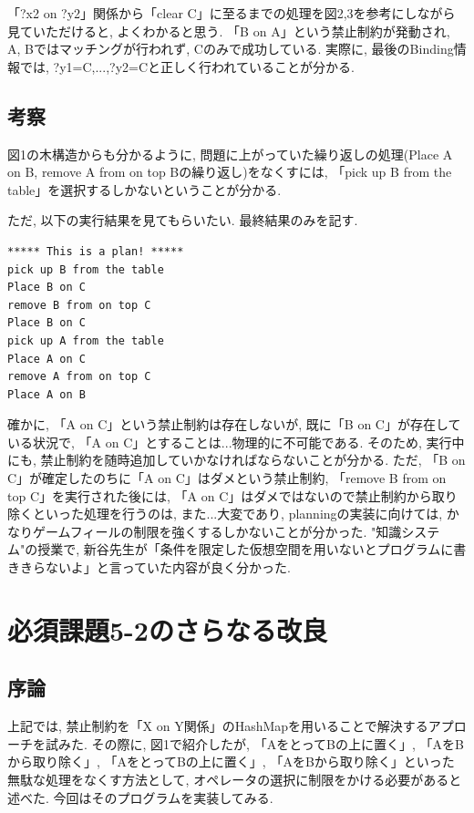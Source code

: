 \documentclass[uplatex,12pt]{jsarticle}
\begin{document}
「?x2 on ?y2」関係から「clear C」に至るまでの処理を図2,3を参考にしながら見ていただけると, よくわかると思う. 「B on A」という禁止制約が発動され, A, Bではマッチングが行われず, Cのみで成功している. 実際に, 最後のBinding情報では, {?y1=C,...,?y2=C}と正しく行われていることが分かる.

\subsection{考察}
図1の木構造からも分かるように, 問題に上がっていた繰り返しの処理(Place A on B, remove A from on top Bの繰り返し)をなくすには, 「pick up B from the table」を選択するしかないということが分かる.

ただ, 以下の実行結果を見てもらいたい. 最終結果のみを記す.
\begin{lstlisting}[caption=A on Cが生じてしまう, label=src:No1]
***** This is a plan! *****
pick up B from the table
Place B on C
remove B from on top C
Place B on C
pick up A from the table
Place A on C
remove A from on top C
Place A on B
\end{lstlisting}


確かに, 「A on C」という禁止制約は存在しないが, 既に「B on C」が存在している状況で, 「A on C」とすることは...物理的に不可能である. そのため, 実行中にも, 禁止制約を随時追加していかなければならないことが分かる. ただ, 「B on C」が確定したのちに「A on C」はダメという禁止制約, 「remove B from on top C」を実行された後には, 「A on C」はダメではないので禁止制約から取り除くといった処理を行うのは, また...大変であり, planningの実装に向けては, かなりゲームフィールの制限を強くするしかないことが分かった. "知識システム"の授業で, 新谷先生が「条件を限定した仮想空間を用いないとプログラムに書ききらないよ」と言っていた内容が良く分かった.


\section{必須課題5-2のさらなる改良}
\subsection{序論}
上記では, 禁止制約を「X on Y関係」のHashMapを用いることで解決するアプローチを試みた. その際に, 図1で紹介したが, 「AをとってBの上に置く」, 「AをBから取り除く」, 「AをとってBの上に置く」, 「AをBから取り除く」といった無駄な処理をなくす方法として, オペレータの選択に制限をかける必要があると述べた. 今回はそのプログラムを実装してみる.
\end{document}
